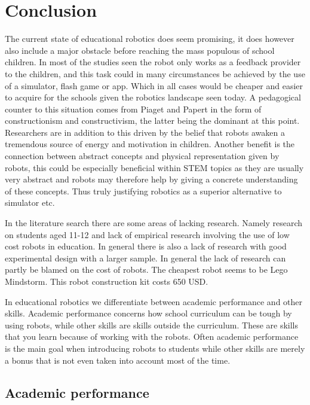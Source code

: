 \section*{Conclusion}
The current state of educational robotics does seem promising, it does however also include a major obstacle before reaching the mass populous of school children.
In most of the studies seen the robot only works as a feedback provider to the children, and this task could in many circumstances be achieved by the use of 
a simulator, flash game or app. Which in all cases would be cheaper and easier to acquire for the schools given the robotics landscape seen today.
A pedagogical counter to this situation comes from Piaget and Papert in the form of constructionism and constructivism, the latter being the dominant at this point. 
Researchers are in addition to this driven by the belief that robots awaken a tremendous source of energy and motivation in children. 
Another benefit is the connection between abstract concepts and physical representation given by robots, this could be especially beneficial within STEM topics as 
they are usually very abstract and robots may therefore help by giving a concrete understanding of these concepts. 
Thus truly justifying robotics as a superior alternative to simulator etc. 

\bigskip\noindent
In the literature search there are some areas of lacking research. Namely research on students aged 11-12 and lack of empirical research involving the use of low cost robots in education. In general there is also a lack of research with good experimental design with a larger sample. In general the lack of research can partly be blamed on the cost of robots. The cheapest robot seems to be Lego Mindstorm. This robot construction kit costs 650 USD. 

\bigskip\noindent
In educational robotics we differentiate between academic performance and other skills. Academic performance concerns how school curriculum can be tough by using robots, while other skills are skills outside the curriculum. These are skills that you learn because of working with the robots. Often academic performance is the main goal when introducing robots to students while other skills are merely a bonus that is not even taken into account most of the time. 

\subsection*{Academic performance}

